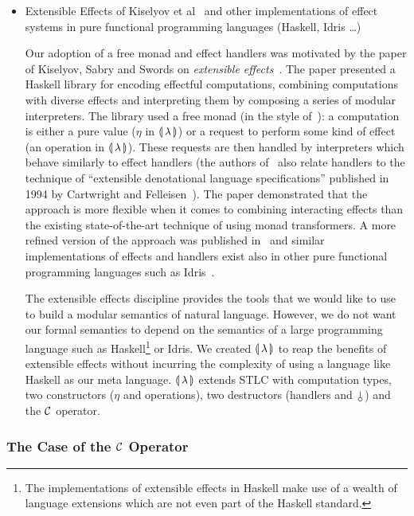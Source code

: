 \begin{itemize}
\item Extensible Effects of Kiselyov et al~\cite{kiselyov2013extensible}
  and other implementations of effect systems in pure functional
  programming languages (Haskell, Idris \ldots)

  Our adoption of a free monad and effect handlers was motivated by the
  paper of Kiselyov, Sabry and Swords on \emph{extensible
    effects}~\cite{kiselyov2013extensible}. The paper presented a Haskell
  library for encoding effectful computations, combining computations with
  diverse effects and interpreting them by composing a series of modular
  interpreters. The library used a free monad (in the style
  of~\cite{swierstra2008data}): a computation is either a pure value
  ($\eta$ in ${\llparenthesis \, \lambda \, \rrparenthesis}$) or a request to perform some kind of effect (an
  operation in ${\llparenthesis \, \lambda \, \rrparenthesis}$). These requests are then handled by interpreters
  which behave similarly to effect handlers (the authors
  of~\cite{kiselyov2013extensible} also relate handlers to the technique of
  ``extensible denotational language specifications'' published in 1994 by
  Cartwright and Felleisen~\cite{cartwright1994extensible}). The paper
  demonstrated that the approach is more flexible when it comes to
  combining interacting effects than the existing state-of-the-art
  technique of using monad transformers. A more refined version of the
  approach was published in~\cite{kiselyov2015freer} and similar
  implementations of effects and handlers exist also in other pure
  functional programming languages such as
  Idris~\cite{brady2013programming}.

  The extensible effects discipline provides the tools that we would like
  to use to build a modular semantics of natural language. However, we do
  not want our formal semantics to depend on the semantics of a large
  programming language such as Haskell\footnote{The implementations of
    extensible effects in Haskell make use of a wealth of language
    extensions which are not even part of the Haskell standard.} or
  Idris. We created ${\llparenthesis \, \lambda \, \rrparenthesis}$ to reap the benefits of extensible effects
  without incurring the complexity of using a language like Haskell as our
  meta language. ${\llparenthesis \, \lambda \, \rrparenthesis}$ extends STLC with computation types, two
  constructors ($\eta$ and operations), two destructors (handlers and
  $\cherry$) and the $\mathcal{C}$ operator.
\end{itemize}


\subsubsection{The Case of the $\mathcal{C}$ Operator}

